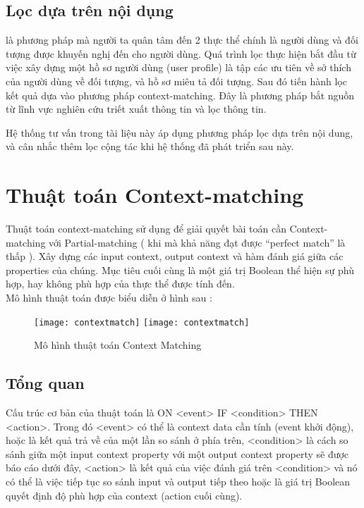 \subsection{Lọc dựa trên nội dụng} là phương pháp mà người ta quân tâm đến 2 thực thể chính là người dùng và đối tượng được khuyến nghị đến cho người dùng. Quá trình lọc thực hiện bắt đầu từ việc xây dựng một hồ sơ người dùng (user profile) là tập các ưu tiên về sở thích của người dùng về đối tượng, và hồ sơ miêu tả đối tượng. Sau đó tiến hành lọc kết quả dựa vào phương pháp context-matching. Đây là phương pháp bắt nguồn từ lĩnh vực nghiên cứu triết xuất thông tin và lọc thông tin.

Hệ thống tư vấn trong tài liệu này áp dụng phương pháp lọc dựa trên nội dung, và cân nhắc thêm lọc cộng tác khi hệ thống đã phát triển sau này.


\section{Thuật toán Context-matching}
Thuật toán context-matching sử dụng để giải quyết bài toán cần Context-matching với Partial-matching ( khi mà khả năng đạt được “perfect match” là thấp ). Xây dựng các input context, output context và hàm đánh giá giữa các properties của chúng. Mục tiêu cuối cùng là một giá trị Boolean thể hiện sự phù hợp, hay không phù hợp của thực thể được tính đến.\\

Mô hình thuật toán được biểu diễn ở hình sau : 

\begin{figure}[!htbp]
  \begin{center}
    \ifpdf
      \texttt{[image: contextmatch]}
    \else
      \texttt{[image: contextmatch]}
    \fi
    \caption{Mô hình thuật toán Context Matching }
    \label{ContextMatching}
  \end{center}
\end{figure}
\subsection{Tổng quan}	
Cấu trúc cơ bản của thuật toán là {ON <event> IF <condition> THEN <action>}. Trong đó <event> có thể là context data cần tính (event khởi động), hoặc là kết quả trả về của một lần so sánh ở phía trên, <condition> là cách so sánh giữa một input context property với một output context property sẽ được báo cáo dưới đây, <action> là kết quả của việc đánh giá trên <condition> và nó có thể là việc tiếp tục so sánh input và output tiếp theo hoặc là giá trị Boolean quyết định độ phù hợp của context (action cuối cùng).

